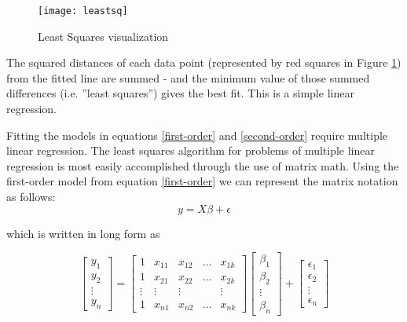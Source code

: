 \begin{figure}[h]\caption{Least Squares visualization}\label{leastsq}
\begin{center}
\texttt{[image: leastsq]}
\end{center}
\end{figure}

The squared distances of each data point (represented by red squares in Figure \ref{leastsq}) from the fitted line are summed - and the minimum value of those summed differences (i.e. ''least squares'') gives the best fit.  This is a simple linear regression.

Fitting the models in equations \ref{first-order} and \ref{second-order} require multiple linear regression. The least squares algorithm for problems of multiple linear regression is most easily accomplished through the use of matrix math.  Using the first-order model from equation \ref{first-order} we can represent the matrix notation as follows:
\begin{equation}
y = X\beta + \epsilon 
\end{equation}


which is written in long form as

\begin{equation}  
\left[
		\begin{array}{c}
		y_{1}\\
		y_{2}\\
		\vdots\\
		y_{n}
		\end{array}
		\right] = 
\left[
		\begin{array}{ccccc}
		1 & x_{11} & x_{12} & \dots & x_{1k}\\
		1 & x_{21} & x_{22} & \dots & x_{2k}\\
		\vdots & \vdots  & \vdots  &  & \vdots \\
		1 & x_{n1} & x_{n2} & \dots & x_{nk}
		\end{array}
		\right]
\left[
		\begin{array}{c}
		\beta_{1}\\
		\beta_{2}\\
		\vdots\\
		\beta_{n}	
		\end{array}
		\right]
+ \left[
		\begin{array}{c}
		\epsilon_{1}\\
		\epsilon_{2}\\
		\vdots\\
		\epsilon_{n}
		\end{array}
		\right]
\end{equation}

